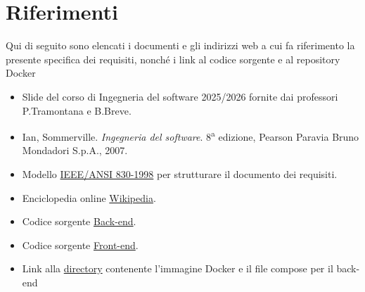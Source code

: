 \section{Riferimenti}
Qui di seguito sono elencati i documenti e gli indirizzi web a cui fa riferimento la presente specifica dei requisiti, nonché i 
link al codice sorgente e al repository Docker
\begin{itemize}
    \item Slide del corso di Ingegneria del software 2025/2026 fornite dai professori P.Tramontana e B.Breve.
    \item Ian, Sommerville. \textit{Ingegneria del software}. 8\textsuperscript{a} edizione, Pearson Paravia Bruno Mondadori S.p.A., 2007.
    \item Modello \href{https://ieeexplore.ieee.org/document/720574}{IEEE/ANSI 830-1998} per strutturare il documento dei requisiti.
    \item Enciclopedia online \href{https://it.wikipedia.org/wiki/Pagina_principale}{Wikipedia}. 
    \item Codice sorgente \href{https://github.com/ubiestubi/ProgettoIngSoft}{Back-end}.
    \item Codice sorgente \href{https://github.com/GiandomenicoIameo/BugBoard26/tree/main}{Front-end}.
    \item Link alla \href{https://communitystudentiunina-my.sharepoint.com/:f:/g/personal/u_musto_studenti_unina_it/IgArB_oG9uFMQ5LTcVQUakrmAcshTORCLn3K1V4J0z0thnY?e=ka4gLm}{directory} contenente l'immagine Docker e il file compose per il back-end
\end{itemize}








